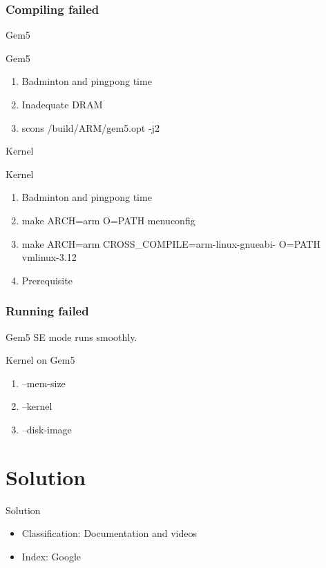 \documentclass{beamer}
\begin{document}
\section{Compiling failed}
\begin{frame}{\secname}{Gem5}
\begin{block}{Gem5}
\begin{enumerate}[<+- | alert@+>]
\item
Badminton and pingpong time
\item
Inadequate DRAM
\item
scons /build/ARM/gem5.opt -j2
\end{enumerate}
\end{block}
\end{frame}
\begin{frame}{\secname}{Kernel}
\begin{block}{Kernel}
\begin{enumerate}[<+-|alert@+>]
\item
Badminton and pingpong time
\item
make ARCH=arm O=PATH menuconfig
\item
make ARCH=arm CROSS\_COMPILE=arm-linux-gnueabi- O=PATH vmlinux-3.12
\item
Prerequisite
\end{enumerate}
\end{block}
\end{frame}
\section{Running failed}
\begin{frame}{\secname}
\begin{block}{Gem5}
SE mode runs smoothly.\pause
\end{block}
\begin{block}{Kernel on Gem5}
\begin{enumerate}[<+-|alert@+>]
\item
--mem-size
\item
--kernel
\item
--disk-image
\end{enumerate}
\end{block}
\end{frame}

\part{Solution}
\begin{frame}
\partpage
\end{frame}
\begin{frame}{Solution}
\begin{itemize}
\item
Classification: Documentation and videos
\item
Index: Google
\end{itemize}


\end{frame}
\end{document}
